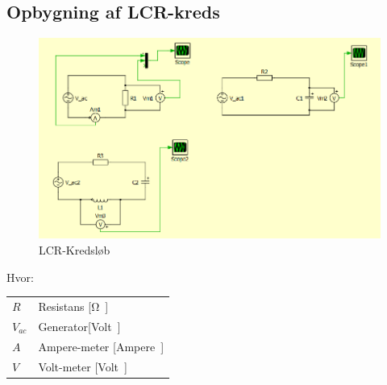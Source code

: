 \newpage
\subsection{Opbygning af LCR-kreds}
\begin{figure}[htbp]
	\centering
	\includegraphics[width=1\textwidth]{Vildledning/Schematics/Eks1_LCR.png}
	\caption{LCR-Kredsløb}
	\label{forslag1}
\end{figure}

Hvor:
\begin{table}[H]
	\begin{tabular}{l|l}
	$R$     & Resistans [\si \ohm] \\
	$V_{ac}$ 	   &  Generator[\si Volt] \\
	$A$ 	   & Ampere-meter [\si Ampere] \\
	$V$			& Volt-meter [\si Volt]
	\end{tabular}
\end{table}

\newpage
